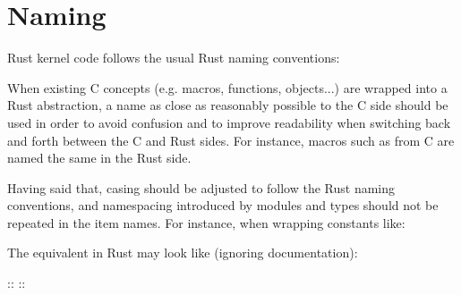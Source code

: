 \documentclass[a4paper,11pt,english]{sphinxmanual}
\begin{document}
\section{Naming}
\label{\detokenize{coding-guidelines:naming}}
Rust kernel code follows the usual Rust naming conventions:
\begin{quote}

\end{quote}

When existing C concepts (e.g. macros, functions, objects...) are wrapped into
a Rust abstraction, a name as close as reasonably possible to the C side should
be used in order to avoid confusion and to improve readability when switching
back and forth between the C and Rust sides. For instance, macros such as
 from C are named the same in the Rust side.

Having said that, casing should be adjusted to follow the Rust naming
conventions, and namespacing introduced by modules and types should not be
repeated in the item names. For instance, when wrapping constants like:

\begin{sphinxVerbatim}[commandchars=\\\{\}]
\end{sphinxVerbatim}

The equivalent in Rust may look like (ignoring documentation):

\begin{sphinxVerbatim}[commandchars=\\\{\}]
 
 
::
::
\end{sphinxVerbatim}
\end{document}
